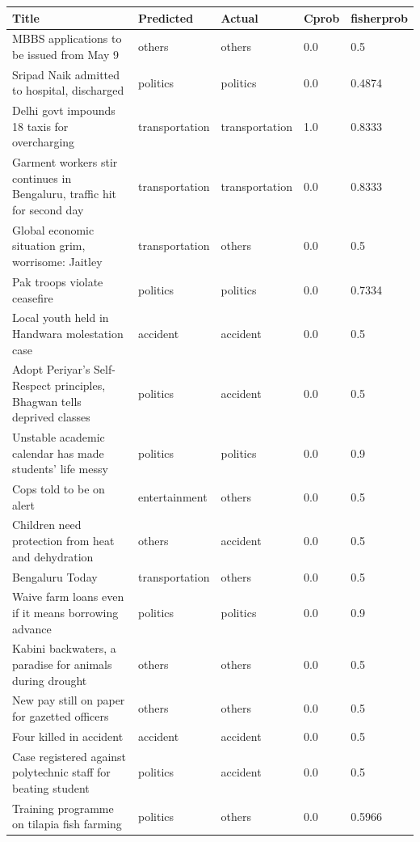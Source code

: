 \begin{table}
\small
\begin{tabular}{ | p{5.4cm} | p{2.0cm} | p{2.0cm}|p{1.3cm}|p{1.5cm}|}
\hline
\textbf{Title} & \textbf{Predicted} & \textbf{Actual}& \textbf{Cprob} & \textbf{fisherprob} \\
\hline
MBBS applications to be issued from May 9 & others  & others & 0.0 & 0.5 \\
\hline
Sripad Naik admitted to hospital, discharged  & politics  & politics & 0.0 & 0.4874 \\
\hline
Delhi govt impounds 18 taxis for overcharging & transportation  & transportation & 1.0 & 0.8333 \\
\hline
Garment workers stir continues in Bengaluru, traffic hit for second day & transportation  & transportation & 0.0 & 0.8333 \\
\hline
Global economic situation grim, worrisome: Jaitley &  transportation  & others & 0.0 & 0.5 \\
\hline
Pak troops violate ceasefire & politics  & politics & 0.0 & 0.7334 \\
\hline
Local youth held in Handwara molestation case & accident  & accident & 0.0 & 0.5 \\
\hline
Adopt Periyar’s Self-Respect principles, Bhagwan tells deprived classes & politics  & accident & 0.0 & 0.5 \\
\hline
Unstable academic calendar has made students’ life messy &  politics  & politics & 0.0 & 0.9 \\
\hline
Cops told to be on alert & entertainment  & others & 0.0 & 0.5 \\
\hline
Children need protection from heat and dehydration & others  & accident & 0.0 & 0.5 \\
\hline
Bengaluru Today & transportation  & others & 0.0 & 0.5 \\
\hline
Waive farm loans even if it means borrowing advance & politics  & politics & 0.0 & 0.9 \\
\hline
Kabini backwaters, a paradise for animals during drought & others  & others & 0.0 & 0.5 \\
\hline
New pay still on paper for gazetted officers & others  & others & 0.0 & 0.5 \\
\hline
Four killed in accident & accident  & accident & 0.0 & 0.5 \\
\hline
Case registered against polytechnic staff for beating student & politics  & accident & 0.0 & 0.5 \\
\hline
Training programme on tilapia fish farming & politics  & others & 0.0 & 0.5966 \\

\end{tabular}
\end{table}
